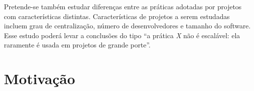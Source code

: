 \documentclass{article}
\begin{document}
Pretende-se também estudar diferenças entre as práticas adotadas por projetos
com características distintas. Características de projetos a serem estudadas
incluem grau de centralização, número de desenvolvedores e tamanho do software.
Esse estudo poderá levar a conclusões do tipo ``a prática \emph{X} não é
escalável: ela raramente é usada em projetos de grande porte''. 


%
%


\section{Motivação}
\end{document}
